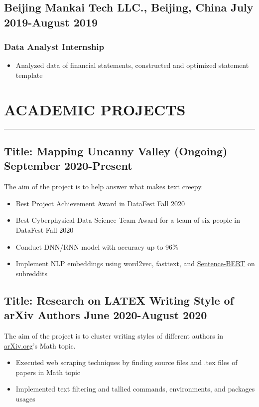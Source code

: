 \documentclass[12pt]{article}
\newcommand{\divider}{\vskip2pt\hrule\vskip2pt}
\begin{document}
		
		\subsection*{Beijing Mankai Tech LLC.{\normalfont, Beijing, China \hfill July 2019-August 2019}}
		\subsubsection*{Data Analyst Internship}
		\begin{itemize}
			\item Analyzed data of financial statements, constructed and optimized statement template
		\end{itemize}
	
	\section*{ACADEMIC PROJECTS}
	\divider
	
		\subsection*{Title: Mapping Uncanny Valley (Ongoing) \hfill {\normalfont September 2020-Present}}
		\noindent
		\href{https://github.com/Anthonyive/Research-Mapping-Uncanny-Valley.git}{} The aim of the project is to help answer what makes text creepy.
		\begin{itemize}
			\setlength\itemsep{-1pt}
			\item Best Project Achievement Award in DataFest Fall 2020
			\item Best Cyberphysical Data Science Team Award for a team of six people in DataFest Fall 2020
			\item Conduct DNN/RNN model with accuracy up to 96\% 
			\item Implement NLP embeddings using word2vec, fasttext, and \href{https://arxiv.org/abs/1908.10084}{Sentence-BERT} on subreddits
		\end{itemize}
	
		\subsection*{Title: Research on LATEX Writing Style of arXiv Authors \hfill {\normalfont June 2020-August 2020}}
		\noindent
		\href{https://github.com/Anthonyive/machine-learning-project.git}{} The aim of the project is to cluster writing styles of different authors in \href{https://arxiv.org}{arXiv.org}’s Math topic.
		\begin{itemize}
			\setlength\itemsep{-1pt}
			\item Executed web scraping techniques by finding source files and .tex files of papers in Math topic
			\item Implemented text filtering and tallied commands, environments, and packages usages
		\end{itemize}
	
\end{document}

